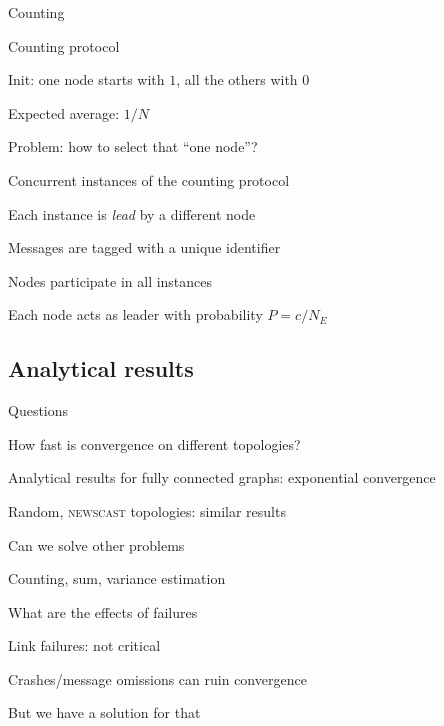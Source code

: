 \begin{frame}{Counting}
	
\begin{block}{Counting protocol}
\BI
\item Init: one node starts with $1$, all the others with $0$
\item Expected average: $1/N$
\EI
\end{block}

\smallskip
\BI
\item Problem: how to select that “one node”?
\item Concurrent instances of the counting protocol
\item Each instance is \textit{lead} by a different node
\item Messages are tagged with a unique identifier 
\item Nodes participate in all instances 
\item Each node acts as leader with probability $P=c/N_E$	
\EI
	
\end{frame}


\subsection{Analytical results}

\begin{frame}{Questions}

\BIL
\item How fast is convergence on different topologies?
	\BI
	\item Analytical results for fully connected graphs: exponential convergence
	\item Random, \textsc{newscast} topologies: similar results
	\EI
\item Can we solve other problems
	\BI
	\item Counting, sum, variance estimation
	\EI
\item What are the effects of failures
	\BI
	\item Link failures: not critical
	\item Crashes/message omissions can ruin convergence
	\item But we have a solution for that
	\EI
\EIL

\end{frame}

